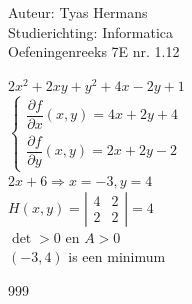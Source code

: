 \documentclass[a4paper]{article}
\begin{document}
  
\noindent \large Auteur: Tyas Hermans \\
\noindent \large Studierichting: Informatica\\
\noindent \large Oefeningenreeks 7E nr. 1.12\\

\medskip

\normalsize

$2x^2+2xy+y^2+4x-2y+1$\\

$\left\{
\begin{array}{l}
\dfrac{\partial f}{\partial x}(x,y) = 4x + 2y +4\\
\dfrac{\partial f}{\partial y}(x,y) = 2x+2y -2
\end{array}
\right.$\\

$2x+6 \Rightarrow x = -3, y = 4$\\

$H(x,y) = \left|
\begin{array}{cc}
4 & 2\\
2 & 2
\end{array}
\right| = 4$\\

$\det > 0$ en $A > 0$\\

$(-3,4)$ is een minimum \\


\begin{thebibliography}{999}
\end{thebibliography}
\end{document}
